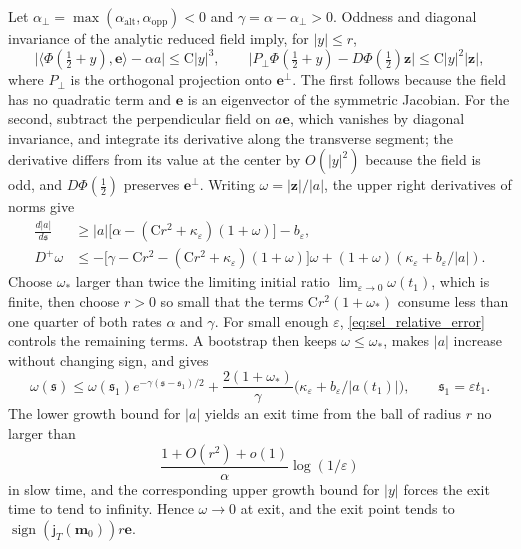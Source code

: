 Let $\alpha_\perp=\max(\alpha_{\mathrm{alt}},\alpha_{\mathrm{opp}})<0$ and $\gamma=\alpha-\alpha_\perp>0$. Oddness and diagonal invariance of the analytic reduced field imply, for $|y|\le r$,
\[
\bigl|\langle\Phi(\tfrac12+y),\mathbf e\rangle-\alpha a\bigr|\le\mathrm C|y|^3,\qquad
\bigl|P_\perp\Phi(\tfrac12+y)-D\Phi(\tfrac12)\mathbf z\bigr|\le\mathrm C|y|^2|\mathbf z|,
\]
where $P_\perp$ is the orthogonal projection onto $\mathbf e^\perp$. The first follows because the field has no quadratic term and $\mathbf e$ is an eigenvector of the symmetric Jacobian. For the second, subtract the perpendicular field on $a\mathbf e$, which vanishes by diagonal invariance, and integrate its derivative along the transverse segment; the derivative differs from its value at the center by $O(|y|^2)$ because the field is odd, and $D\Phi(\frac12)$ preserves $\mathbf e^\perp$. Writing $\omega=|\mathbf z|/|a|$, the upper right derivatives of norms give
\begin{equation}
\begin{aligned}
\frac{d|a|}{d\mathfrak s}&\ge|a|\bigl[\alpha-(\mathrm Cr^2+\kappa_\varepsilon)(1+\omega)\bigr]-b_\varepsilon,\\
D^+\omega&\le-\bigl[\gamma-\mathrm Cr^2-(\mathrm Cr^2+\kappa_\varepsilon)(1+\omega)\bigr]\omega+(1+\omega)(\kappa_\varepsilon+b_\varepsilon/|a|).
\end{aligned}
\label{eq:sel_cone}
\end{equation}
Choose $\omega_*$ larger than twice the limiting initial ratio $\lim_{\varepsilon\to0}\omega(t_1)$, which is finite, then choose $r>0$ so small that the terms $\mathrm Cr^2(1+\omega_*)$ consume less than one quarter of both rates $\alpha$ and $\gamma$. For small enough $\varepsilon$, \eqref{eq:sel_relative_error} controls the remaining terms. A bootstrap then keeps $\omega\le\omega_*$, makes $|a|$ increase without changing sign, and gives
\[
\omega(\mathfrak s)\le\omega(\mathfrak s_1)e^{-\gamma(\mathfrak s-\mathfrak s_1)/2}+\frac{2(1+\omega_*)}\gamma\bigl(\kappa_\varepsilon+b_\varepsilon/|a(t_1)|\bigr),\qquad\mathfrak s_1=\varepsilon t_1.
\]
The lower growth bound for $|a|$ yields an exit time from the ball of radius $r$ no larger than
\[
\frac{1+O(r^2)+o(1)}\alpha\log(1/\varepsilon)
\]
in slow time, and the corresponding upper growth bound for $|y|$ forces the exit time to tend to infinity. Hence $\omega\to0$ at exit, and the exit point tends to $\operatorname{sign}(\mathsf j_T(\mathbf m_0))r\mathbf e$.

